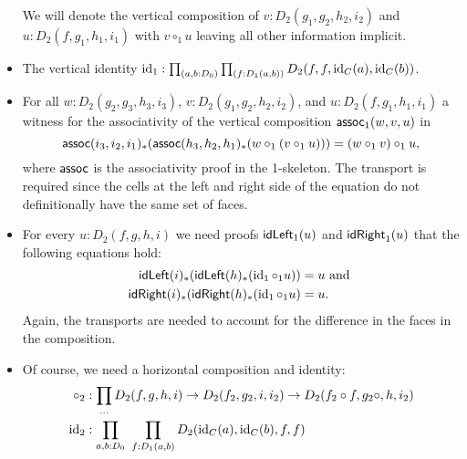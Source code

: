 \begin{defn}
\begin{itemize}
We will denote the vertical composition of $v : D_2(g_1, g_2, h_2, i_2)$ and
$u: D_2(f, g_1, h_1, i_1)$ with $v \circ_1 u$ leaving all other information implicit.
\item The vertical identity $\operatorname{id}_1 : \prod_{(a,b:D_0)} \prod_{(f : D_1(a,b))}
D_2(f,f,\operatorname{id}_C(a),\operatorname{id}_C(b))$.
\item For all $w : D_2(g_2,g_3,h_3,i_3)$, $v : D_2(g_1,g_2,h_2,i_2)$,
and $u : D_2(f,g_1,h_1,i_1)$ a witness for the associativity of the vertical
composition $\mathsf{assoc}_1(w, v, u)$ in %
\begin{equation*}
\mathsf{assoc}(i_3,i_2,i_1)_*(\mathsf{assoc}(h_3,h_2,h_1)_*(w \circ_1 (v \circ_1 u))) =
(w \circ_1 v) \circ_1 u \text{,}
\end{equation*}
where $\mathsf{assoc}$ is the associativity proof in the 1-skeleton.
The transport is required since the cells at the left and right side of the equation
do not definitionally have the same set of faces.
\item For every $u : D_2(f, g, h, i)$ we need proofs $\mathsf{idLeft}_1(u)$ and $\mathsf{idRight}_1(u)$
that the following equations hold:
\begin{align*}
\mathsf{idLeft}(i)_*(\mathsf{idLeft}(h)_*(\operatorname{id}_1 \circ_1 u)) &= u \text{ and } \\
\mathsf{idRight}(i)_*(\mathsf{idRight}(h)_*(\operatorname{id}_1 \circ_1 u) &= u \text{.}
\end{align*}
Again, the transports are needed to account for the difference in the faces
in the composition.
\item Of course, we need a horizontal composition and identity:
\begin{align*}
\circ_2 &: \prod_{\ldots} D_2(f,g,h,i) \to D_2(f_2,g_2,i,i_2) 
	\to D_2(f_2 \circ f,g_2\circ,h,i_2) \\
\operatorname{id}_2 &: \prod_{a,b:D_0} ~ \prod_{f : D_1(a,b)} D_2(\operatorname{id}_C(a),\operatorname{id}_C(b),f,f)
\end{align*}


\end{itemize}
\end{defn}
